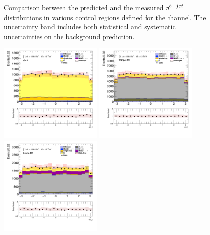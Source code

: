\begin{figure}[!htp]
\begin{center}
			\end{center}
			\caption{
			Comparison between the predicted and the measured $\eta^{b-jet}$ distributions in various control regions defined for the \taujets channel. The uncertainty band includes both statistical and systematic uncertainties on the background prediction. 
			}
			\label{fig:bkg-bjet-eta-taujets}
		\end{figure}

		\begin{figure}[!htp]
			\begin{center}    
			\includegraphics[width=0.45\textwidth]{chapters/chapter6_HPlus/images/taujets/tau_0_phi_TTBAR.png}
			\includegraphics[width=0.45\textwidth]{chapters/chapter6_HPlus/images/taujets/tau_0_phi_WJETS.png} \\
			\includegraphics[width=0.45\textwidth]{chapters/chapter6_HPlus/images/taujets/tau_0_phi_BVETO.png}

\end{center}
\end{figure}
